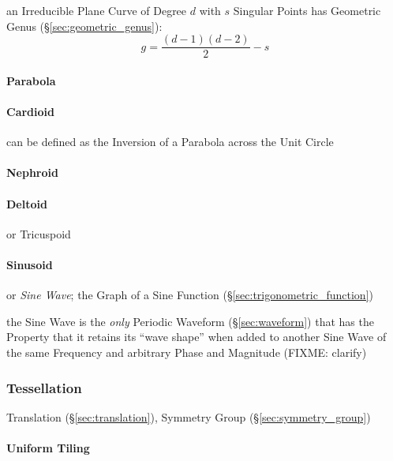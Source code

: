 an Irreducible Plane Curve of Degree $d$ with $s$ Singular Points has Geometric
Genus (\S\ref{sec:geometric_genus}):
\[
  g = \frac{(d-1)(d-2)}{2} - s
\]



\paragraph{Parabola}\label{sec:parabola}\hfill

\paragraph{Cardioid}\label{sec:cardioid}\hfill

can be defined as the Inversion of a Parabola across the Unit Circle

\paragraph{Nephroid}\label{sec:nephroid}\hfill

\paragraph{Deltoid}\label{sec:deltoid}\hfill

or Tricuspoid



\paragraph{Sinusoid}\label{sec:sinusoid}\hfill

or \emph{Sine Wave}; the Graph of a Sine Function
(\S\ref{sec:trigonometric_function})

the Sine Wave is the \emph{only} Periodic Waveform (\S\ref{sec:waveform}) that
has the Property that it retains its ``wave shape'' when added to another Sine
Wave of the same Frequency and arbitrary Phase and Magnitude (FIXME: clarify)



\subsubsection{Tessellation}\label{sec:tessellation}

\fist Translation (\S\ref{sec:translation}), Symmetry Group
(\S\ref{sec:symmetry_group})



\paragraph{Uniform Tiling}\label{sec:uniform_tiling}\hfill


